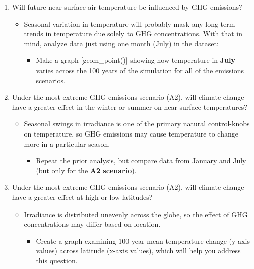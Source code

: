\documentclass[11pt,]{article}
\providecommand{\tightlist}{%
\setlength{\itemsep}{0pt}\setlength{\parskip}{0pt}}
\begin{document}
\pagebreak

\begin{enumerate}
\def\labelenumi{\arabic{enumi}.}
\tightlist
\item
  Will future near-surface air temperature be influenced by GHG
  emissions?

  \begin{itemize}
  \tightlist
  \item
    Seasonal variation in temperature will probably mask any long-term
    trends in temperature due solely to GHG concentrations. With that in
    mind, analyze data just using one month (July) in the dataset:

    \begin{itemize}
    \tightlist
    \item
      Make a graph {[}geom\_point(){]} showing how temperature in
      \textbf{July} varies across the 100 years of the simulation for
      all of the emissions scenarios.
    \end{itemize}
  \end{itemize}
\item
  Under the most extreme GHG emissions scenario (A2), will climate
  change have a greater effect in the winter or summer on near-surface
  temperatures?

  \begin{itemize}
  \tightlist
  \item
    Seasonal swings in irradiance is one of the primary natural
    control-knobs on temperature, so GHG emissions may cause temperature
    to change more in a particular season.

    \begin{itemize}
    \tightlist
    \item
      Repeat the prior analysis, but compare data from January and July
      (but only for the \textbf{A2 scenario}).
    \end{itemize}
  \end{itemize}
\item
  Under the most extreme GHG emissions scenario (A2), will climate
  change have a greater effect at high or low latitudes?

  \begin{itemize}
  \tightlist
  \item
    Irradiance is distributed unevenly across the globe, so the effect
    of GHG concentrations may differ based on location.

    \begin{itemize}
    \tightlist
    \item
      Create a graph examining 100-year mean temperature change (y-axis
      values) across latitude (x-axis values), which will help you
      address this question.
    \end{itemize}
  \end{itemize}
\end{enumerate}
\end{document}
